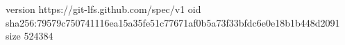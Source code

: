 version https://git-lfs.github.com/spec/v1
oid sha256:79579c750741116ea15a35fe51c77671af0b5a73f33bfdc6e0e18b1b448d2091
size 524384
